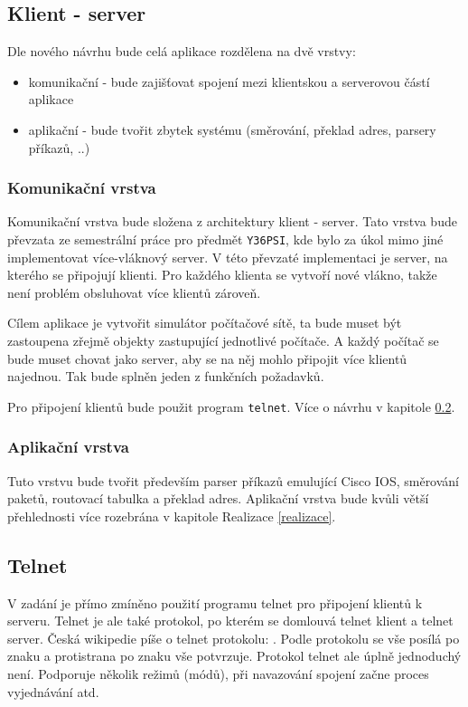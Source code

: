 
\subsection{Klient - server}\label{klient_server}
Dle nového návrhu bude celá aplikace rozdělena na dvě vrstvy:
\begin{itemize}
 \item komunikační - bude zajišťovat spojení mezi klientskou a serverovou částí aplikace
 \item aplikační - bude tvořit zbytek systému (směrování, překlad adres, parsery příkazů, ..)
\end{itemize}

\subsubsection{Komunikační vrstva}
Komunikační vrstva bude složena z architektury klient - server. Tato vrstva bude převzata ze semestrální práce pro předmět \verb|Y36PSI|, kde bylo za úkol mimo jiné implementovat více-vláknový server. V této převzaté implementaci je server, na kterého se připojují klienti. Pro každého klienta se vytvoří nové vlákno, takže není problém obsluhovat více klientů zároveň. 

Cílem aplikace je vytvořit simulátor počítačové sítě, ta bude muset být zastoupena zřejmě objekty zastupující jednotlivé počítače. A každý počítač se bude muset chovat jako server, aby se na něj mohlo připojit více klientů najednou. Tak bude splněn jeden z funkčních požadavků.

Pro připojení klientů bude použit program \verb|telnet|. Více o návrhu v kapitole \ref{telnet}. 


\subsubsection{Aplikační vrstva}
Tuto vrstvu bude tvořit především parser příkazů emulující Cisco IOS, směrování paketů, routovací tabulka a překlad adres. Aplikační vrstva bude kvůli větší přehlednosti více rozebrána v kapitole Realizace \ref{realizace}.


\subsection{Telnet} \label{telnet}
V zadání je přímo zmíněno použití programu telnet pro připojení klientů k serveru. Telnet je ale také protokol, po kterém se domlouvá telnet klient a telnet server. Česká wikipedie píše o telnet protokolu: . Podle protokolu se vše posílá po znaku a protistrana po znaku vše potvrzuje. Protokol telnet ale úplně jednoduchý není. Podporuje několik režimů (módů), při navazování spojení začne proces vyjednávání atd. 


